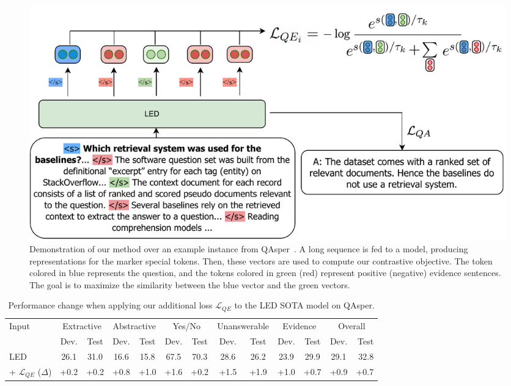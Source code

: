 \begin{figure}
\centering
  \centering
\includegraphics[width=0.99\linewidth]{figures/fig2.pdf}
\caption{Demonstration of our method over an example instance from QAsper~\cite{dasigi-etal-2021-dataset}. A long sequence is fed to a model, producing representations for the marker special tokens. Then, these vectors are used to compute our contrastive objective. The token colored in blue represents the question, and the tokens colored in green (red) represent positive (negative) evidence sentences. The goal is to maximize the similarity between the blue vector and the green vectors.}
\label{fig:model}
\end{figure}

\begin{table}[t]
\footnotesize
\centering
\renewcommand{\arraystretch}{1.}
\begin{tabular}{@{}lcccccccc|cc|cr@{}}
\toprule
\multirow{2}{*}{Input} & \multicolumn{2}{c}{Extractive} & \multicolumn{2}{c}{Abstractive} & \multicolumn{2}{c}{Yes/No} & \multicolumn{2}{c}{Unanswerable} &
\multicolumn{2}{c}{Evidence} & \multicolumn{2}{c}{Overall} \\
& Dev. & Test & Dev. & Test & Dev. & Test & Dev. & Test & Dev. & Test & Dev. & Test \\
\midrule
LED     \citeyearpar{longformer}                    & 26.1 & 31.0 & 16.6 & 15.8 & 67.5 & 70.3 & 28.6 & 26.2 & 23.9  & 29.9& 29.1&  32.8\\
+ $\mathcal{L}_{QE}$ ($\Delta$)  & +0.2 & +0.2 & +0.8 & +1.0 & +1.6 & +0.2 & +1.5 & +1.9 & +1.0 & +0.7 & +0.9 & +0.7 \\
\bottomrule
\end{tabular}
\caption{Performance change when applying our additional loss $\mathcal{L}_{QE}$ to the LED SOTA model on QAsper.} %
\label{tab:qasper_results}
\end{table}

